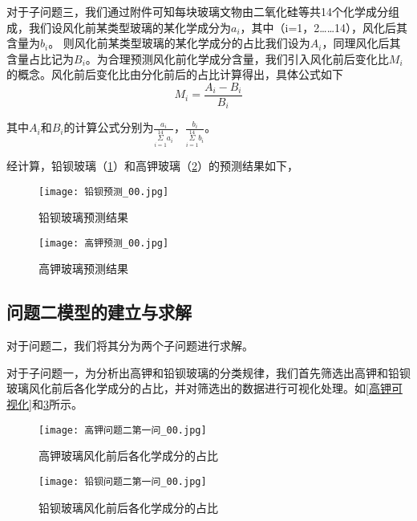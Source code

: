 \documentclass{MathModeling}
\begin{document}
		{\heiti 对于子问题三}，我们通过附件可知每块玻璃文物由二氧化硅等共14个化学成分组成，我们设风化前某类型玻璃的某化学成分为${a_i}$，其中（i=1，2……14），风化后其含量为${b_i}$。
		则风化前某类型玻璃的某化学成分的占比我们设为${A_i}$，同理风化后其含量占比记为${B_i}$。为合理预测风化前化学成分含量，我们引入风化前后变化比${M_i}$的概念。风化前后变化比由分化前后的占比计算得出，具体公式如下
		\begin{equation}
		M_i=\frac{A_i-B_i}{B_i}
		\end{equation}
		   
		其中${A_i}$和${B_i}$的计算公式分别为$\frac{a_i}{\underset{i=1}{\overset{14}{\varSigma}}a_i}$，$\frac{b_i}{\underset{i=1}{\overset{14}{\varSigma}}b_i}$。
	
		经计算，铅钡玻璃（\textcolor{blue}{\cref{铅钡预测}}）和高钾玻璃（\textcolor{blue}{\cref{高钾预测}}）的预测结果如下，
	
	\begin{figure}[H]
		\centering
		\texttt{[image: 铅钡预测\_00.jpg]}
		\caption{铅钡玻璃预测结果}
		\label{铅钡预测}
	\end{figure}
	\begin{figure}[H]
		\centering
		\texttt{[image: 高钾预测\_00.jpg]}
		\caption{高钾玻璃预测结果}
		\label{高钾预测}
	\end{figure}
 
	\subsection{问题二模型的建立与求解}
	对于问题二，我们将其分为两个子问题进行求解。

	{\heiti 对于子问题一}，为分析出高钾和铅钡玻璃的分类规律，我们首先筛选出高钾和铅钡玻璃风化前后各化学成分的占比，并对筛选出的数据进行可视化处理。如\textcolor{blue}{\cref{高钾可视化}}和\textcolor{blue}{\cref{铅钡可视化}}所示。
	\begin{figure}[htbp]
		\begin{minipage}[t]{0.5\textwidth}%
			\centering
			\texttt{[image: 高钾问题二第一问\_00.jpg]}
			\caption{高钾玻璃风化前后各化学成分的占比}%
			\label{高钾可视化}
			\end{minipage}
			\begin{minipage}[t]{0.5\textwidth}
			\centering
			\texttt{[image: 铅钡问题二第一问\_00.jpg]}
			\caption{铅钡玻璃风化前后各化学成分的占比}
			\label{铅钡可视化}
			\end{minipage}
			\end{figure}
	
\end{document}
